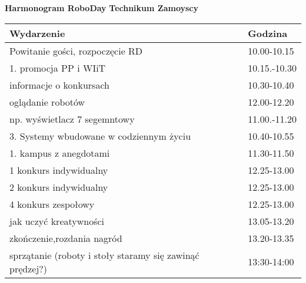\documentclass{article}
\begin{document}
\begin{center}
\Large\textbf{Harmonogram RoboDay}
\large\textbf{Technikum Zamoyscy}
\end{center}
\vspace{1cm}
\begin{center}
\begin{tabular}{|l|l|}
\hline
\textbf{Wydarzenie} & \textbf{Godzina} \\
\hline
Powitanie gości, rozpoczęcie RD & 10.00-10.15 \\
\hline
1. promocja PP i WIiT & 10.15.-10.30 \\
\hline
informacje o konkursach & 10.30-10.40 \\
\hline
oglądanie robotów & 12.00-12.20 \\
\hline
np. wyświetlacz 7 segemntowy & 11.00.-11.20 \\
\hline
3. Systemy wbudowane w codziennym życiu & 10.40-10.55 \\
\hline
1. kampus z anegdotami & 11.30-11.50 \\
\hline
1 konkurs indywidualny & 12.25-13.00 \\
\hline
2 konkurs indywidualny & 12.25-13.00 \\
\hline
4 konkurs zespołowy & 12.25-13.00 \\
\hline
jak uczyć kreatywności & 13.05-13.20 \\
\hline
zkończenie,rozdania nagród & 13.20-13.35 \\
\hline
sprzątanie (roboty i stoły staramy się zawinąć prędzej?) & 13:30-14:00 \\
\hline
\end{tabular}
\end{center}
\end{document}
